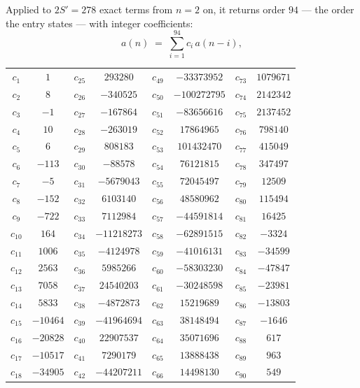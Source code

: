 \documentclass[11pt,a4paper]{article}
\theoremstyle{plain}
\theoremstyle{definition}
\begin{document}
Applied to $2S'=278$ exact terms from $n=2$ on, it returns order $94$ --- the
order the entry states --- with integer coefficients:
\[
a(n)\;=\;\sum_{i=1}^{94}c_i\,a(n-i),
\]
\begin{center}\small
\begin{tabular}{cccccccc}
$c_{1}$ & $1$ & $c_{25}$ & $293280$ & $c_{49}$ & $-33373952$ & $c_{73}$ & $1079671$ \\
$c_{2}$ & $8$ & $c_{26}$ & $-340525$ & $c_{50}$ & $-100272795$ & $c_{74}$ & $2142342$ \\
$c_{3}$ & $-1$ & $c_{27}$ & $-167864$ & $c_{51}$ & $-83656616$ & $c_{75}$ & $2137452$ \\
$c_{4}$ & $10$ & $c_{28}$ & $-263019$ & $c_{52}$ & $17864965$ & $c_{76}$ & $798140$ \\
$c_{5}$ & $6$ & $c_{29}$ & $808183$ & $c_{53}$ & $101432470$ & $c_{77}$ & $415049$ \\
$c_{6}$ & $-113$ & $c_{30}$ & $-88578$ & $c_{54}$ & $76121815$ & $c_{78}$ & $347497$ \\
$c_{7}$ & $-5$ & $c_{31}$ & $-5679043$ & $c_{55}$ & $72045497$ & $c_{79}$ & $12509$ \\
$c_{8}$ & $-152$ & $c_{32}$ & $6103140$ & $c_{56}$ & $48580962$ & $c_{80}$ & $115494$ \\
$c_{9}$ & $-722$ & $c_{33}$ & $7112984$ & $c_{57}$ & $-44591814$ & $c_{81}$ & $16425$ \\
$c_{10}$ & $164$ & $c_{34}$ & $-11218273$ & $c_{58}$ & $-62891515$ & $c_{82}$ & $-3324$ \\
$c_{11}$ & $1006$ & $c_{35}$ & $-4124978$ & $c_{59}$ & $-41016131$ & $c_{83}$ & $-34599$ \\
$c_{12}$ & $2563$ & $c_{36}$ & $5985266$ & $c_{60}$ & $-58303230$ & $c_{84}$ & $-47847$ \\
$c_{13}$ & $7058$ & $c_{37}$ & $24540203$ & $c_{61}$ & $-30248598$ & $c_{85}$ & $-23981$ \\
$c_{14}$ & $5833$ & $c_{38}$ & $-4872873$ & $c_{62}$ & $15219689$ & $c_{86}$ & $-13803$ \\
$c_{15}$ & $-10464$ & $c_{39}$ & $-41964694$ & $c_{63}$ & $38148494$ & $c_{87}$ & $-1646$ \\
$c_{16}$ & $-20828$ & $c_{40}$ & $22907537$ & $c_{64}$ & $35071696$ & $c_{88}$ & $617$ \\
$c_{17}$ & $-10517$ & $c_{41}$ & $7290179$ & $c_{65}$ & $13888438$ & $c_{89}$ & $963$ \\
$c_{18}$ & $-34905$ & $c_{42}$ & $-44207211$ & $c_{66}$ & $14498130$ & $c_{90}$ & $549$ \\

\end{tabular}
\end{center}
\end{document}
